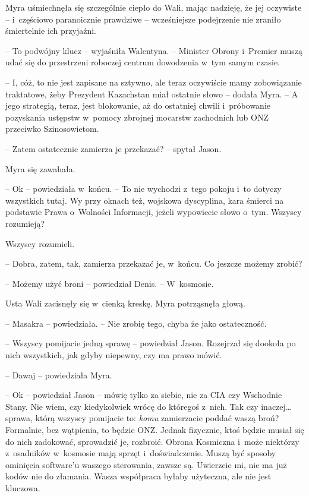\documentclass[oneside,polish,11pt,sfheadings]{mwbk}
\begin{document}
Myra uśmiechnęła się szczególnie ciepło do Wali, mając nadzieję, że jej
oczywiste -- i~częściowo paranoicznie prawdziwe -- wcześniejsze
podejrzenie nie zraniło śmiertelnie ich przyjaźni.

-- To podwójny klucz -- wyjaśniła Walentyna. -- Minister Obrony i~Premier
muszą udać się do przestrzeni roboczej centrum dowodzenia w~tym samym
czasie.

-- I, cóż, to nie jest zapisane na sztywno, ale teraz oczywiście mamy
zobowiązanie traktatowe, żeby Prezydent Kazachstan miał ostatnie słowo -- dodała Myra. -- A jego strategią, teraz, jest blokowanie, aż do ostatniej
chwili i~próbowanie pozyskania ustępstw w~pomocy zbrojnej mocarstw
zachodnich lub ONZ przeciwko Szinosowietom.

-- Zatem ostatecznie zamierza je przekazać? -- spytał Jason.

Myra się zawahała. 

-- Ok -- powiedziała w~końcu. -- To nie wychodzi z~tego
pokoju i~to dotyczy wszystkich tutaj. Wy przy oknach też, wojskowa
dyscyplina, kara śmierci na podstawie Prawa o~Wolności Informacji,
jeżeli wypowiecie słowo o~tym. Wszyscy rozumieją?

Wszyscy rozumieli.

-- Dobra, zatem, tak, zamierza przekazać je, w~końcu. Co jeszcze możemy
zrobić?

-- Możemy użyć broni -- powiedział Denis. -- W~kosmosie.

Usta Wali zacisnęły się w~cienką kreskę. Myra potrząsnęła głową.

-- Masakra -- powiedziała. -- Nie zrobię tego, chyba że jako ostateczność.

-- Wszyscy pomijacie jedną sprawę -- powiedział Jason. Rozejrzał się
dookoła po nich wszystkich, jak gdyby niepewny, czy ma prawo mówić.

-- Dawaj -- powiedziała Myra.

-- Ok -- powiedział Jason -- mówię tylko za siebie, nie za CIA czy
Wschodnie Stany. Nie wiem, czy kiedykolwiek wrócę do któregoś z~nich.
Tak czy inaczej\ldots sprawa, którą wszyscy pomijacie to: \textit{komu}
zamierzacie poddać waszą broń? Formalnie, bez wątpienia, to będzie ONZ.
Jednak fizycznie, ktoś będzie musiał się do nich zadokować, sprowadzić
je, rozbroić. Obrona Kosmiczna i~może niektórzy z~osadników w~kosmosie
mają sprzęt i~doświadczenie. Muszą być sposoby ominięcia software'u
waszego sterowania, zawsze są. Uwierzcie mi, nie ma już kodów nie do
złamania. Wasza współpraca byłaby użyteczna, ale nie jest kluczowa.
\end{document}
